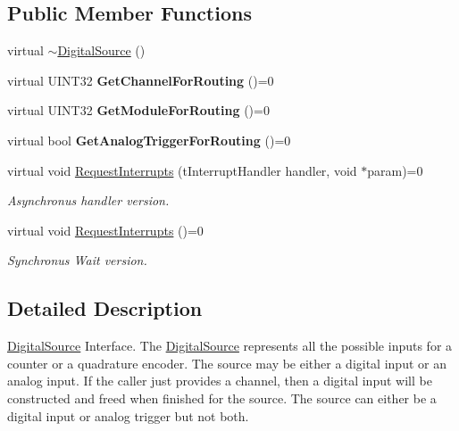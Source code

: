\subsection*{Public Member Functions}
\begin{DoxyCompactItemize}
\item 
virtual \hyperlink{classDigitalSource_a7acf991168815aeed0b8e7514400802b}{$\sim$DigitalSource} ()
\item 
\hypertarget{classDigitalSource_a793640916ab6c7ed63325756033f2752}{
virtual UINT32 {\bfseries GetChannelForRouting} ()=0}
\label{classDigitalSource_a793640916ab6c7ed63325756033f2752}

\item 
\hypertarget{classDigitalSource_a688c770f6ec4bfdfe8ea61a78ca6c31d}{
virtual UINT32 {\bfseries GetModuleForRouting} ()=0}
\label{classDigitalSource_a688c770f6ec4bfdfe8ea61a78ca6c31d}

\item 
\hypertarget{classDigitalSource_aa9a9f4c8d6e54b94516b2b015bdb1ee6}{
virtual bool {\bfseries GetAnalogTriggerForRouting} ()=0}
\label{classDigitalSource_aa9a9f4c8d6e54b94516b2b015bdb1ee6}

\item 
\hypertarget{classDigitalSource_aa34b225d5dc38355ff8bd0a11b6113d3}{
virtual void \hyperlink{classDigitalSource_aa34b225d5dc38355ff8bd0a11b6113d3}{RequestInterrupts} (tInterruptHandler handler, void $\ast$param)=0}
\label{classDigitalSource_aa34b225d5dc38355ff8bd0a11b6113d3}

\begin{DoxyCompactList}\small\item\em Asynchronus handler version. \end{DoxyCompactList}\item 
\hypertarget{classDigitalSource_a693e9521e21758c8d5f3d221dc9e9b5b}{
virtual void \hyperlink{classDigitalSource_a693e9521e21758c8d5f3d221dc9e9b5b}{RequestInterrupts} ()=0}
\label{classDigitalSource_a693e9521e21758c8d5f3d221dc9e9b5b}

\begin{DoxyCompactList}\small\item\em Synchronus Wait version. \end{DoxyCompactList}\end{DoxyCompactItemize}


\subsection{Detailed Description}
\hyperlink{classDigitalSource}{DigitalSource} Interface. The \hyperlink{classDigitalSource}{DigitalSource} represents all the possible inputs for a counter or a quadrature encoder. The source may be either a digital input or an analog input. If the caller just provides a channel, then a digital input will be constructed and freed when finished for the source. The source can either be a digital input or analog trigger but not both. 

